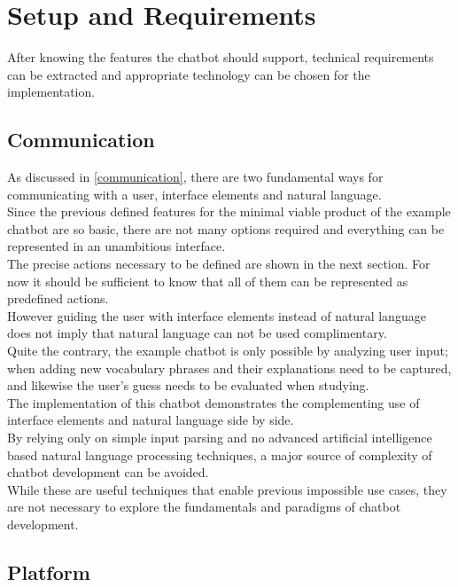 \section{Setup and Requirements}

After knowing the features the chatbot should support,
technical requirements can be extracted
and appropriate technology can be chosen for the implementation.


\subsection{Communication}

As discussed in \ref{communication},
there are two fundamental ways for communicating with a user,
interface elements and natural language.
\\

Since the previous defined features for the minimal viable product of the example chatbot are so basic,
there are not many options required and everything can be represented in an unambitious interface.
\\

The precise actions necessary to be defined are shown in the next section.
For now it should be sufficient to know that all of them can be represented as predefined actions.
\\
However guiding the user with interface elements instead of natural language
does not imply that natural language can not be used complimentary.
\\
Quite the contrary, the example chatbot is only possible by analyzing user input;
when adding new vocabulary phrases and their explanations need to be captured,
and likewise the user's guess needs to be evaluated when studying.
\\

The implementation of this chatbot demonstrates the complementing use of interface elements and natural language side by side.
\\

By relying only on simple input parsing and no advanced artificial intelligence based natural language processing techniques,
a major source of complexity of chatbot development can be avoided.
\\
While these are useful techniques that enable previous impossible use cases,
they are not necessary to explore the fundamentals and paradigms of chatbot development.
\\

\subsection{Platform}

